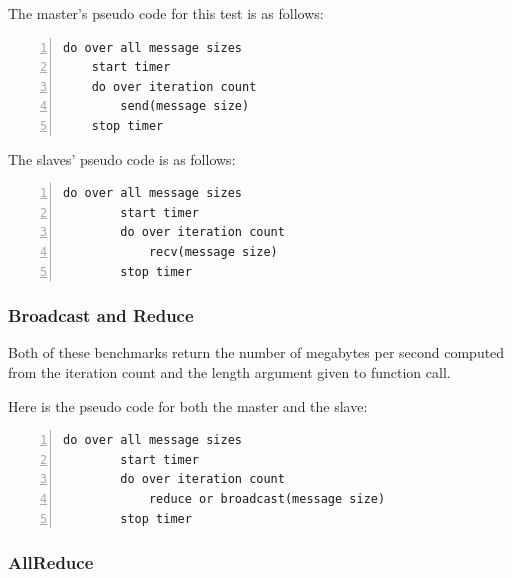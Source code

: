 The master's pseudo code for this test is as follows:

\begin{minipage}{\textwidth}
\end{minipage}

\begin{minipage}{\textwidth}
\begin{lstlisting}[frame=single,numbers=left]
do over all message sizes 
    start timer
    do over iteration count 
        send(message size) 
    stop timer
\end{lstlisting}    
\end{minipage}

The slaves' pseudo code is as follows:

\begin{minipage}{\textwidth}
\end{minipage}

\begin{minipage}{\textwidth}
\begin{lstlisting}[frame=single,numbers=left]
   do over all message sizes 
        start timer
        do over iteration count 
            recv(message size) 
        stop timer
\end{lstlisting}
\end{minipage}

\subsubsection{Broadcast and Reduce}

Both of these benchmarks return the number of megabytes per second computed
from the iteration count and the length argument given to function call.

Here is the pseudo code for both the master and the slave:

\begin{minipage}{\textwidth}
\end{minipage}

\begin{minipage}{\textwidth}
\begin{lstlisting}[frame=single,numbers=left]
   do over all message sizes 
        start timer
        do over iteration count
            reduce or broadcast(message size)
        stop timer
\end{lstlisting}
\end{minipage}

\subsubsection{AllReduce}

